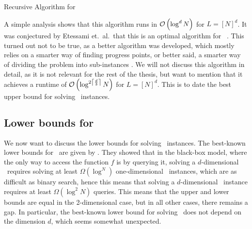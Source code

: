 \begin{algorithm}
    \caption{Recursive Algorithm for \Tarski}
    \label{alg:recursive_tarski_solver}
\end{algorithm}

A simple analysis shows that this algorithm runs in $\mathcal{O}\left(\log^{d}{N}\right)$ for $L = [N]^d$. It was conjectured by Etessami et.\ al.\ that this is an optimal algorithm for \Tarski\ . This turned out not to be true, as a better algorithm was developed, which mostly relies on a smarter way of finding progress points, or better said, a smarter way of dividing the problem into sub-instances . We will not discuss this algorithm in detail, as it is not relevant for the rest of the thesis, but want to mention that it achieves a runtime of $\mathcal{O}\left(\log^{2\left\lceil\frac{d}{3}\right\rceil}{N}\right)$ for $L = [N]^d$. This is to date the best upper bound for solving \Tarski\ instances.

\subsection{Lower bounds for \Tarski}

We now want to discuss the lower bounds for solving \Tarski\ instances. The best-known lower bounds for \Tarski\ are given by . They showed that in the black-box model, where the only way to access the function $f$ is by querying it, solving a $d$-dimensional \Tarski\ requires solving at least $\Omega(\log^{N})$ one-dimensional \Tarski\ instances, which are as difficult as binary search, hence this means that solving a $d$-dimensional \Tarski\ instance requires at least $\Omega(\log^{2}{N})$ queries. This means that the upper and lower bounds are equal in the 2-dimensional case, but in all other cases, there remains a gap. In particular, the best-known lower bound for solving \Tarski\ does not depend on the dimension $d$, which seems somewhat unexpected.

